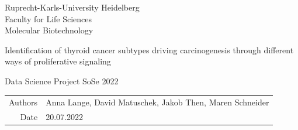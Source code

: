 \documentclass[
  parskip,
  oneside]{scrreprt}
\author{}
\date{\vspace{-2.5em}}
\begin{document}
\begin{titlepage}
\centering
    {\Large Ruprecht-Karls-University Heidelberg\\
        Faculty for Life Sciences\\
        Molecular Biotechnology\\}

    {}
    {

        {\Huge Identification of thyroid cancer subtypes driving carcinogenesis through different ways of proliferative signaling }

    }

    {\Large Data Science Project SoSe 2022}


    {\small
        \begin{tabular}{rl}
            Authors & Anna Lange, David Matuschek, Jakob Then, Maren Schneider\\
            Date & 20.07.2022\\
        \end{tabular}
    }


\end{titlepage}

\end{document}
